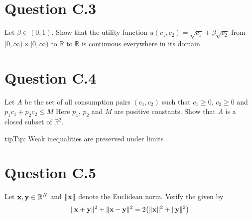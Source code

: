 \documentclass[letterpaper,10pt,english]{jupyterBook}
\begin{document}
\section{Question C.3}
\label{\detokenize{04.exercises:question-c-3}}
\sphinxAtStartPar
Let \(\beta \in (0,1)\). Show that the utility function \(u(c_1,c_2) = \sqrt{c_1} + \beta \sqrt{c_2}\) from \([0,\infty) \times [0,\infty)\) to \(\mathbb{R}\) to \(\mathbb{R}\) is continuous everywhere in its domain.


\section{Question C.4}
\label{\detokenize{04.exercises:question-c-4}}
\sphinxAtStartPar
Let \(A\) be the set of all consumption pairs \((c_1,c_2)\) such that \(c_1 \ge 0\), \(c_2 \ge 0\) and \(p_1 c_1 + p_2 c_2 \le M\) Here \(p_1\), \(p_2\) and \(M\) are positive constants. Show that \(A\) is a closed subset of \(\mathbb{R}^2\).

\begin{sphinxadmonition}{tip}{Tip:}
\sphinxAtStartPar
Weak inequalities are preserved under limits
\end{sphinxadmonition}


\section{Question C.5}
\label{\detokenize{04.exercises:question-c-5}}
\sphinxAtStartPar
Let \({\bf x}, {\bf y} \in \mathbb{R}^N\) and \(\| {\bf x} \| \) denote the Euclidean norm.  Verify the  given by
\begin{equation*}
\begin{split}
\| {\bf x} + {\bf y} \|^2 + \| {\bf x} - {\bf y} \|^2 = 2 \big( \| {\bf x} \|^2 + \| {\bf y} \|^2 \big)
\end{split}
\end{equation*}






\renewcommand{\indexname}{Index}
\printindex
\end{document}
